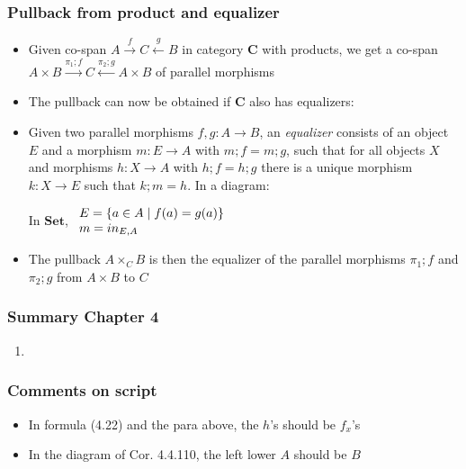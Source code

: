 \documentclass[handout]{beamer}
\newcommand{\bfsf}[1]{{\boldsymbol{#1}}}
\newcommand{\Set}{\bfsf{Set}}
\newcommand{\CC}{\bfsf{C}}
\begin{document}
\frame
  {   
    \frametitle{Pullback from product and equalizer}\label{Ch4:PullbProdEq}

 \begin{itemize}[<+->]
\item Given co-span $A\stackrel{f}{\to} C\stackrel{g}{\leftarrow}B$ in 
category $\CC$ with products, we get a co-span
$A\times B\stackrel{\pi_1;f}{\to} C\stackrel{\pi_2;g}{\leftarrow}A\times B$
of parallel morphisms
\item The pullback can now be obtained if $\CC$ also has equalizers:
\item Given two parallel morphisms $f,g: A\to B$, an \emph{equalizer}
consists of an object $E$ and a morphism $m:E\to A$ with $m;f=m;g$,
such that for all objects $X$ and morphisms $h:X\to A$ with $h;f=h;g$
there is a unique morphism $k: X\to E$ such that $k;m = h$. In a diagram:
In $\Set$, %
$\begin{array}{ll}E=\{a\in A\mid f(a)=g(a)\}\\m=in_{E,A}\end{array}$
\item The pullback $A\times_C B$ is then the equalizer of the parallel
morphisms $\pi_1;f$ and $\pi_2;g$ from $A\times B$ to $C$
 \end{itemize}

 }


\frame
  {   
    \frametitle{Summary Chapter 4}\label{Ch4:Summary}

 \begin{enumerate}[<+->]
\item 
 \end{enumerate}


}

\frame
  {   
    \frametitle{Comments on script}\label{Ch4:comments}

 \begin{itemize}[<+->]
\item In formula (4.22) and the para above, the $h$'s should be $f_x$'s
\item In the diagram of Cor. 4.4.110, the left lower $A$ should be $B$
 \end{itemize}

 }
\end{document}
